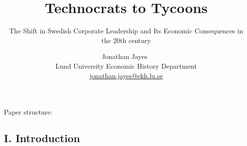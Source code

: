 \documentclass[
]{article}
\title{Technocrats to Tycoons}
\subtitle{The Shift in Swedish Corporate Leadership and Its Economic
Consequences in the 20th century}
\author{
{\large Jonathan Jayes~\orcidlink{0000-0003-4967-4869}}%
 \\%
Lund University Economic History Department \\%
{\footnotesize \url{jonathan.jayes@ekh.lu.se}} \and
}
\date{}
\newcommand{\published}[1]{%
   \gdef\puB{#1}}
\newcommand{\puB}{}
\begin{document}
\published{\textbf{Tuesday, March 4, 2025} \\ {\scriptsize Access the
code, data, and analysis at
\url{https://github.com/j-jayes/who-is-who-etl} and
\url{https://github.com/j-jayes/Swedish-annual-reports-archive}}}

\maketitle






Paper structure:

\subsection{I. Introduction}\label{i.-introduction}
\end{document}
